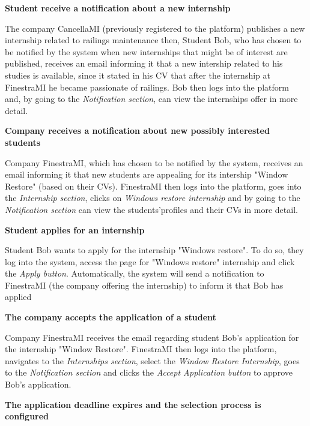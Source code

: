 			\textbf{Student receive a notification about a new internship}
			\begin{flushleft}
				The company CancellaMI (previously registered to the platform) publishes a new internship related to railings maintenance then, Student Bob, who has chosen to be notified by the system when new internships that might be of interest are published, receives an email informing it that a new intership related to his studies is available, since it stated in his CV that after the internship at FinestraMI he became passionate of railings. Bob then logs into the platform and, by going to the \emph{Notification section}, can view the internships offer in more detail.
			\end{flushleft}
			\textbf{Company receives a notification about new possibly interested students}
			\begin{flushleft}
				Company FinestraMI, which has chosen to be notified by the system, receives an email informing it that new students are appealing for its intership "Window Restore" (based on their CVs). FinestraMI then logs into the platform, goes into the \emph{Internship section}, clicks on \emph{Windows restore internship} and by going to the \emph{Notification section} can view the students'profiles and their CVs in more detail.
			\end{flushleft}
			\textbf{Student applies for an internship}
			\begin{flushleft}
				Student Bob wants to apply for the internship "Windows restore". To do so, they log into the system, access the page for "Windows restore" internship and click the \emph{Apply button}. Automatically, the system will send a notification to FinestraMI (the company offering the internship) to inform it that Bob has applied
			\end{flushleft}
			\textbf{The company accepts the application of a student}
			\begin{flushleft}
				Company FinestraMI receives the email regarding student Bob's application for the internship "Window Restore". FinestraMI then logs into the platform, navigates to the \emph{Internships section}, select the \emph{Window Restore Internship}, goes to the \emph{Notification section} and clicks the \emph{Accept Application button} to approve Bob's application.
			\end{flushleft}
			\textbf{The application deadline expires and the selection process is configured}
